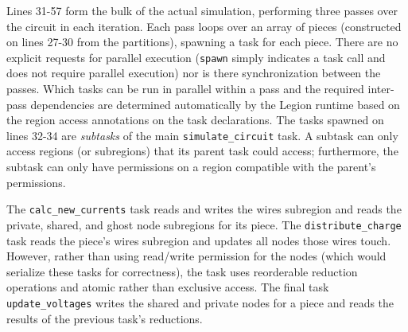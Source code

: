 Lines 31-57 form the bulk of the actual simulation, performing three
passes over the circuit in each iteration.  Each pass loops over an
array of pieces (constructed on lines 27-30 from the partitions),
spawning a task for each piece.  There are no explicit requests for
parallel execution ({\tt spawn} simply indicates a task call and does
not require parallel execution) nor is there synchronization 
between the passes.  Which tasks can be run in
parallel within a pass and the required inter-pass dependencies are
determined automatically by the Legion runtime based on the region
access annotations on the task declarations.  The tasks spawned on
lines 32-34 are {\em subtasks} of the main {\tt simulate\_circuit}
task. A subtask can only access regions (or subregions) that its parent task
could access; furthermore, the subtask can only have permissions on a
region compatible with the parent's permissions.  

The  {\tt calc\_new\_currents} task reads and writes the wires subregion 
and reads the private, shared, and ghost node subregions for its piece.
The {\tt distribute\_charge} task reads the piece's 
wires subregion and updates all nodes those wires touch.  However,
rather than using read/write permission for the nodes (which would
serialize these tasks for correctness), the task
uses reorderable reduction operations and 
atomic rather than exclusive access. The final task 
{\tt update\_voltages} writes the shared and private nodes for a piece
and reads the results of the previous task's reductions.

  



